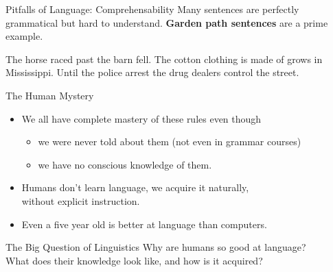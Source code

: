 \documentclass[xcolor={usenames,svgnames,x11names,dvipsnames,table}]{beamer}
\begin{document}
\begin{frame}{Pitfalls of Language: Comprehensability}
    Many sentences are perfectly grammatical but hard to understand.
    \textbf{Garden path sentences} are a prime example.
    \begin{exe}
        \small
        \ex
        \begin{xlist}
            \ex The horse raced past the barn fell.
            \ex The cotton clothing is made of grows in Mississippi.
            \ex Until the police arrest the drug dealers control the street.
        \end{xlist}
    \end{exe}
\end{frame}

\begin{frame}{The Human Mystery}
    \begin{itemize}
        \item We all have complete mastery of these rules even though
            \begin{itemize}
                \item we were never told about them (not even in grammar courses)
                \item we have no conscious knowledge of them.
            \end{itemize}
        \item Humans don't learn language, we acquire it naturally,\\
            without explicit instruction.
        \item Even a five year old is better at language than computers. 
    \end{itemize}

    \pause
    \begin{block}{The Big Question of Linguistics}
        Why are humans so good at language?\\
        What does their knowledge look like, and how is it acquired?
    \end{block}
\end{frame}
\end{document}
